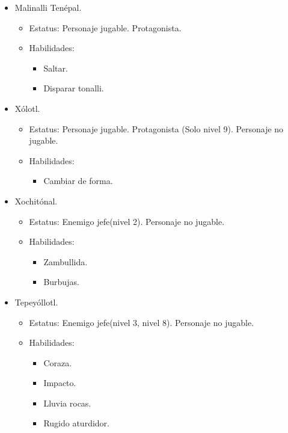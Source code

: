 	\begin{itemize}
		\item Malinalli Tenépal.
			\begin{itemize}
				\item Estatus: Personaje jugable. Protagonista.
				\item Habilidades: 
					\begin{itemize}
						\item Saltar.
						\item Disparar tonalli.
					\end{itemize}
			\end{itemize}
		\item Xólotl.
			\begin{itemize}
				\item Estatus: Personaje jugable. Protagonista (Solo nivel 9). Personaje 
				no jugable.
				\item Habilidades: 
					\begin{itemize}
						\item Cambiar de forma.
					\end{itemize}
			\end{itemize}
		\item Xochitónal.
			\begin{itemize}
				\item Estatus: Enemigo jefe(nivel 2). Personaje no jugable.
				\item Habilidades: 
					\begin{itemize}
						\item Zambullida.
						\item Burbujas.
					\end{itemize}
			\end{itemize}
		\item Tepeyóllotl.
			\begin{itemize}
				\item Estatus: Enemigo jefe(nivel 3, nivel 8). Personaje no jugable.
				\item Habilidades: 
					\begin{itemize}
						\item Coraza.
						\item Impacto.
						\item Lluvia rocas.
						\item Rugido aturdidor.
					\end{itemize}

\end{itemize}
\end{itemize}
